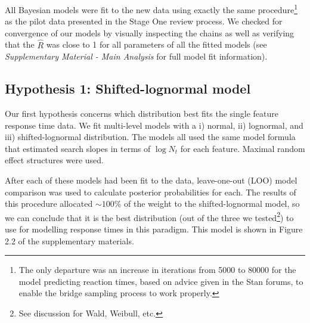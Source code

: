 \documentclass[preprint,12pt,authoryear]{elsarticle}
\begin{document}
All Bayesian models were fit to the new data using exactly the same procedure\footnote{The only departure was an increase in iterations from 5000 to 80000 for the model predicting reaction times, based on advice given in the Stan forums, to enable the bridge sampling process to work properly.} as the pilot data presented in the Stage One review process. We checked for convergence of our models by visually inspecting the chains as well as verifying that the $\hat{R}$ was close to 1 for all parameters of all the fitted models (see \textit{Supplementary Material - Main Analysis} for full model fit information).

\subsection{Hypothesis 1: Shifted-lognormal model}

Our first hypothesis concerns which distribution best fits the single feature response time data. We fit multi-level models with
a i) normal, ii) lognormal, and iii) shifted-lognormal distribution. The models all used the same model formula that estimated search slopes in terms of $\log{N_t}$ for each feature. Maximal random effect structures were used. 

After each of these models had been fit to the data, leave-one-out (LOO) model comparison was used to calculate posterior probabilities for each. The results of this procedure allocated $\sim100\%$ of the weight to the shifted-lognormal model, so we can conclude that it is the best distribution (out of the three we tested\footnote{See discussion for Wald, Weibull, etc.}) to use for modelling response times in this paradigm. This model is shown in Figure 2.2 of the supplementary materials.

\end{document}
